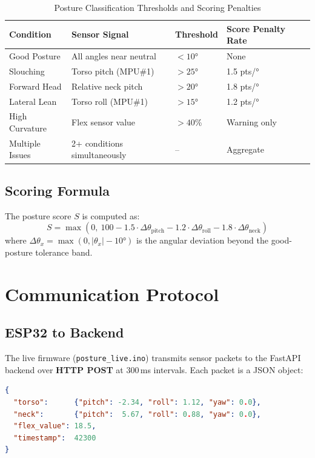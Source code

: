 \documentclass[12pt,a4paper]{report}
\newcommand{\code}[1]{\texttt{\small\color{accentviolet}#1}}
\begin{document}
\begin{table}[H]
\centering
\caption{Posture Classification Thresholds and Scoring Penalties}
\label{tab:thresholds}
\begin{tabular}{lllll}
\toprule
\textbf{Condition} & \textbf{Sensor Signal} & \textbf{Threshold} & \textbf{Score Penalty Rate} \\
\midrule
Good Posture        & All angles near neutral       & $< 10°$     & None \\
Slouching           & Torso pitch (MPU\#1)          & $> 25°$     & 1.5 pts/° \\
Forward Head        & Relative neck pitch           & $> 20°$     & 1.8 pts/° \\
Lateral Lean        & Torso roll (MPU\#1)           & $> 15°$     & 1.2 pts/° \\
High Curvature      & Flex sensor value             & $> 40$\%    & Warning only \\
Multiple Issues     & 2+ conditions simultaneously  & --          & Aggregate \\
\bottomrule
\end{tabular}
\end{table}

\subsection{Scoring Formula}

The posture score $S$ is computed as:
\[
    S = \max\left(0,\ 100 - 1.5 \cdot \Delta\theta_{\text{pitch}} - 1.2 \cdot \Delta\theta_{\text{roll}} - 1.8 \cdot \Delta\theta_{\text{neck}}\right)
\]
where $\Delta\theta_x = \max(0, |\theta_x| - 10°)$ is the angular deviation beyond the good-posture tolerance band.

\section{Communication Protocol}

\subsection{ESP32 to Backend}

The live firmware (\code{posture\_live.ino}) transmits sensor packets to the FastAPI backend over \textbf{HTTP POST} at 300\,ms intervals. Each packet is a JSON object:

\begin{lstlisting}[language=json, caption={Sensor Packet JSON Structure}]
{
  "torso":      {"pitch": -2.34, "roll": 1.12, "yaw": 0.0},
  "neck":       {"pitch":  5.67, "roll": 0.88, "yaw": 0.0},
  "flex_value": 18.5,
  "timestamp":  42300
}
\end{lstlisting}
\end{document}
